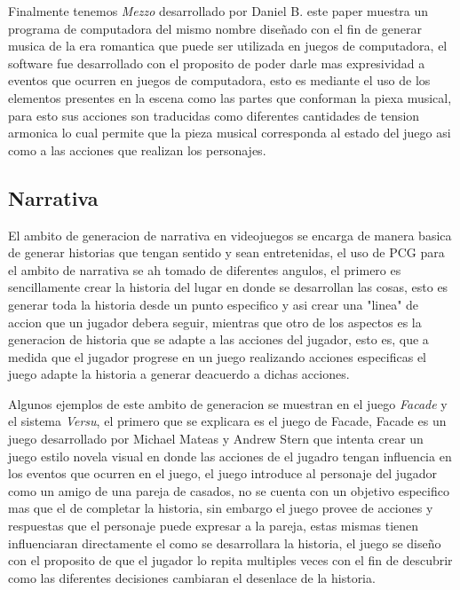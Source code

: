 Finalmente tenemos \textit{Mezzo} desarrollado por Daniel B. este paper muestra
un programa de computadora del mismo nombre diseñado con el fin de generar
musica de la era romantica que puede ser utilizada en juegos de computadora, el
software fue desarrollado con el proposito de poder darle mas expresividad a
eventos que ocurren en juegos de computadora, esto es mediante el uso de los
elementos presentes en la escena como las partes que conforman la piexa musical,
para esto sus acciones son traducidas como diferentes cantidades de tension
armonica lo cual permite que la pieza musical corresponda al estado del juego
asi como a las acciones que realizan los personajes.

\subsection{Narrativa}
\label{subsection:Narrative}

El ambito de generacion de narrativa en videojuegos se encarga de manera basica
de generar historias que tengan sentido y sean entretenidas, el uso de PCG para
el ambito de narrativa se ah tomado de diferentes angulos, el primero es
sencillamente crear la historia del lugar en donde se desarrollan las cosas,
esto es generar toda la historia desde un punto especifico y asi crear una
"linea" de accion que un jugador debera seguir, mientras que otro de los
aspectos es la generacion de historia que se adapte a las acciones del jugador,
esto es, que a medida que el jugador progrese en un juego realizando acciones
especificas el juego adapte la historia a generar deacuerdo a dichas acciones.

Algunos ejemplos de este ambito de generacion se muestran en el juego
\textit{Facade} y el sistema \textit{Versu}, el primero que se explicara es el
juego de Facade, Facade es un juego desarrollado por Michael Mateas y Andrew
Stern \cite{mateas2003faccade} que intenta crear un juego estilo novela visual
en donde las acciones de el jugadro tengan influencia en los eventos que ocurren
en el juego, el juego introduce al personaje del jugador como un amigo de una
pareja de casados, no se cuenta con un objetivo especifico mas que el de
completar la historia, sin embargo el juego provee de acciones y respuestas que
el personaje puede expresar a la pareja, estas mismas tienen influenciaran
directamente el como se desarrollara la historia, el juego se diseño con el
proposito de que el jugador lo repita multiples veces con el fin de descubrir
como las diferentes decisiones cambiaran el desenlace de la historia. 

